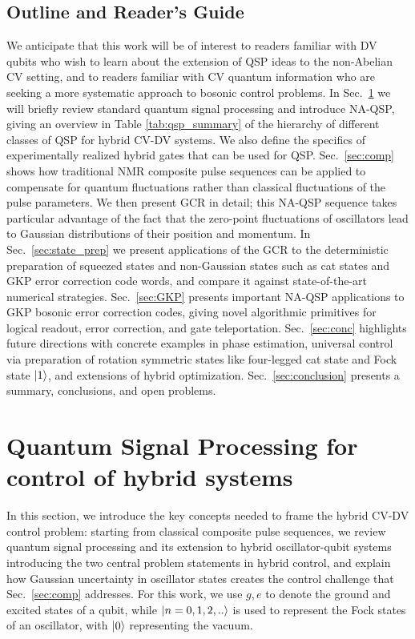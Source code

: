 \documentclass[aps,prx,showpacs,notitlepage,twocolumn,superscriptaddress,nofootinbib,preprintnumbers,floatfix,10pt, longbibliography]{revtex4-2}
\begin{document}
\subsection{Outline and Reader's Guide}
We anticipate that this work will be of interest to readers familiar with DV qubits who wish to learn about the extension of QSP ideas to the non-Abelian CV setting, and to readers familiar with CV quantum information who are seeking a more systematic approach to bosonic control problems.
In Sec.~\ref{sec:preliminaries} we will briefly review standard quantum signal processing and introduce NA-QSP, giving an overview in Table \ref{tab:qsp_summary} of the hierarchy of different classes of QSP for hybrid CV-DV systems. We also define the specifics of experimentally realized hybrid gates that can be used for QSP.  Sec.~\ref{sec:comp} shows how traditional NMR composite pulse sequences can be applied to compensate for quantum fluctuations rather than classical fluctuations of the pulse parameters. We then present GCR in detail; this NA-QSP sequence takes particular advantage of the fact that the zero-point fluctuations of oscillators lead to Gaussian distributions of their position and momentum. In Sec.~\ref{sec:state_prep} we present applications of the GCR to the deterministic preparation of squeezed states and non-Gaussian states such as cat states and GKP error correction code words, and compare it against state-of-the-art numerical strategies.  Sec.~\ref{sec:GKP} presents important NA-QSP applications to GKP bosonic error correction codes, giving novel algorithmic primitives for logical readout, error correction, and gate teleportation.  Sec.~\ref{sec:conc} highlights future directions with concrete examples in phase estimation, universal control via preparation of rotation symmetric states like four-legged cat state and Fock state $\ket{1}$, and extensions of hybrid optimization. Sec.~\ref{sec:conclusion} presents a summary, conclusions, and open problems.

\section{Quantum Signal Processing for control of hybrid systems}\label{sec:preliminaries}
In this section, we introduce the key concepts needed to frame the hybrid CV-DV control problem: starting from classical composite pulse sequences, we review quantum signal processing and its extension to hybrid oscillator-qubit systems introducing the two central problem statements in hybrid control, and explain how Gaussian uncertainty in oscillator states creates the control challenge that Sec.~\ref{sec:comp} addresses. For this work, we use $g,e$ to denote the ground and excited states of a qubit, while $\ket{n=0,1,2,..}$ is used to represent the Fock states of an oscillator, with $\ket{0}$ representing the vacuum.
\end{document}
